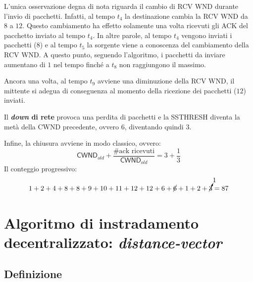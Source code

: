 \documentclass[a4paper]{article}
\begin{document}
	\noindent
	L’unica osservazione degna di nota riguarda il cambio di \textsf{RCV WND} durante l’invio di pacchetti. Infatti, al tempo $t_{4}$ la destinazione cambia la \textsf{RCV WND} da $8$ a $12$. Questo cambiamento ha effetto solamente una volta ricevuti gli \textsf{ACK} del pacchetto inviato al tempo $t_{4}$. In altre parole, al tempo $t_{4}$ vengono inviati i pacchetti ($8$) e al tempo $t_{5}$ la sorgente viene a conoscenza del cambiamento della \textsf{RCV WND}. A questo punto, seguendo l’algoritmo, i pacchetti da inviare aumentano di $1$ nel tempo finché a $t_{8}$ non raggiungono il massimo.\newline
	
	\noindent
	Ancora una volta, al tempo $t_{9}$ avviene una diminuzione della \textsf{RCV WND}, il mittente si adegua di conseguenza al momento della ricezione dei pacchetti ($12$) inviati.\newline
	
	\noindent
	Il \textbf{\emph{down} di rete} provoca una perdita di pacchetti e la \textsf{SSTHRESH} diventa la metà della \textsf{CWND} precedente, ovvero $6$, diventando quindi $3$.\newline
	
	\noindent
	Infine, la chiusura avviene in modo classico, ovvero:
	\begin{equation*}
		\textsf{CWND}_{old} + \dfrac{\text{\#ack ricevuti}}{\textsf{CWND}_{old}} = 3 + \dfrac{1}{3}
	\end{equation*}
	Il conteggio progressivo:
	\begin{equation*}
		1+2+4+8+8+9+10+11+12+12+6+\cancel{6}+1+2+\cancelto{1}{3}=87
	\end{equation*}\newpage

	\section{Algoritmo di instradamento decentralizzato: \emph{distance-vector}}
	
	\subsection{Definizione}
	
\end{document}
